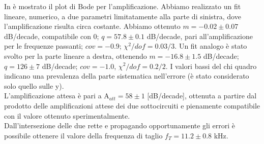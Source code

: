 In  è mostrato il plot di Bode per l'amplificazione. Abbiamo realizzato un fit lineare, numerico, a due parametri limitatamente alla parte di sinistra, dove l'amplificazione risulta circa costante. Abbiamo ottenuto $m = -0.02 \pm 0.07$ dB/decade, compatibile con 0; $q = 57.8 \pm 0.1$ dB/decade, pari all'amplificazione per le frequenze passanti; $cov = -0.9$; $ \chi ^2/dof = 0.03/3$. Un fit analogo è stato svolto per la parte lineare a destra, ottenendo $m = -16.8 \pm 1.5$ dB/decade; $q = 126 \pm 7$ dB/decade; $cov = -1.0$, $ \chi ^2/dof = 0.2/2$. I valori bassi del chi quadro indicano una prevalenza della parte sistematica nell'errore (è stato considerato solo quello sulle y).\\
L'amplificazione attesa è pari a A$_{att} = 58 \pm 1$ [dB/decade], ottenuta a partire dal prodotto delle amplificazioni attese dei due sottocircuiti e pienamente compatibile con il valore ottenuto sperimentalmente.\\
Dall'intersezione delle due rette e propagando opportunamente gli errori è possibile ottenere il valore della frequenza di taglio $f_T = 11.2 \pm 0.8$ kHz.

